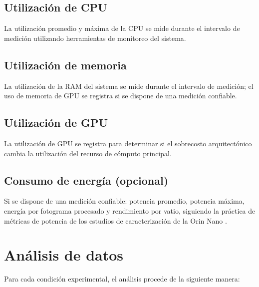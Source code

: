 \subsection{Utilización de CPU}

La utilización promedio y máxima de la CPU se mide durante el intervalo de
medición utilizando herramientas de monitoreo del sistema.

\subsection{Utilización de memoria}

La utilización de la RAM del sistema se mide durante el intervalo de
medición; el uso de memoria de GPU se registra si se dispone de una medición
confiable.

\subsection{Utilización de GPU}

La utilización de GPU se registra para determinar si el sobrecosto
arquitectónico cambia la utilización del recurso de cómputo principal.

\subsection{Consumo de energía (opcional)}

Si se dispone de una medición confiable: potencia promedio, potencia
máxima, energía por fotograma procesado y rendimiento por vatio, siguiendo
la práctica de métricas de potencia de los estudios de caracterización de la
Orin Nano \cite{zequn2026}.

\section{Análisis de datos}
\label{sec:analysis}

Para cada condición experimental, el análisis procede de la siguiente
manera:

